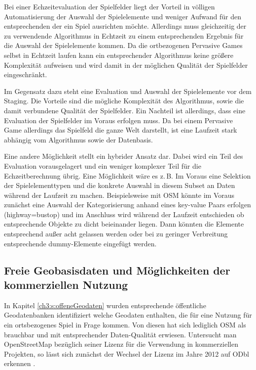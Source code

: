 Bei einer Echzeitevaluation der Spielfelder liegt der Vorteil in völligen Automatisierung der Auswahl der Spielelemente und weniger Aufwand für den entsprechenden der ein Spiel ausrichten möchte. Allerdings muss gleichzeitig der zu verwendende Algorithmus in Echtzeit zu einem entsprechenden Ergebnis für die Auswahl der Spielelemente kommen. Da die ortbezogenen Pervasive Games selbst in Echtzeit laufen kann ein entsprechender Algorithmus keine größere Komplexität aufweisen und wird damit in der möglichen Qualität der Spielfelder eingeschränkt.

Im Gegensatz dazu steht eine Evaluation und Auswahl der Spielelemente vor dem Staging. Die Vorteile sind die mögliche Komplexität des Algorithmus, sowie die damit verbundene Qualität der Spielfelder. Ein Nachteil ist allerdings, dass eine Evaluation der Spielfelder im Voraus erfolgen muss. Da bei einem Pervasive Game allerdings das Spielfeld die ganze Welt darstellt, ist eine Laufzeit stark abhängig vom Algorithmus sowie der Datenbasis.

Eine andere Möglichkeit stellt ein hybrider Ansatz dar. Dabei wird ein Teil des Evaluation vorausgelagert und ein weniger komplexer Teil für die Echzeitberechnung übrig. Eine Möglichkeit wäre es z.\,B. Im Voraus eine Selektion der Spielelementtypen und die konkrete Auswahl in diesem Subset an Daten während der Laufzeit zu machen. Beispielsweise mit OSM könnte im Voraus zunächst eine Auswahl der Kategorisierung anhand eines key-value Paars erfolgen (highway=bustop) und im Anschluss wird während der Laufzeit entschieden ob entsprechende Objekte zu dicht beieinander liegen. Dann könnten die Elemente entsprechend außer acht gelassen werden oder bei zu geringer Verbreitung entsprechende dummy-Elemente eingefügt werden.

\subsection*{Freie Geobasisdaten und Möglichkeiten der kommerziellen Nutzung}

In Kapitel \ref{ch3:s:offeneGeodaten} wurden entsprechende öffentliche Geodatenbanken identifiziert welche Geodaten enthalten, die für eine Nutzung für ein ortsbezogenes Spiel in Frage kommen. Von diesen hat sich lediglich OSM als brauchbar und mit entsprechender Daten-Qualität erwiesen. Untersucht man OpenStreetMap bezüglich seiner Lizenz für die Verwendung in kommerziellen Projekten, so lässt sich zunächst der Wechsel der Lizenz im Jahre 2012 auf ODbl erkennen \cite{Ramthun.2012}.

